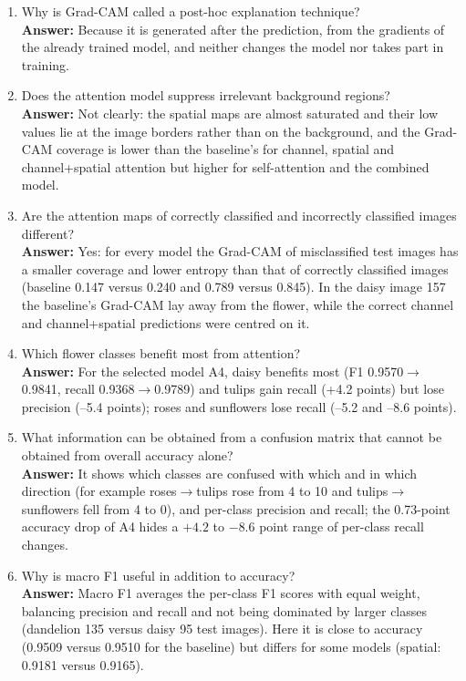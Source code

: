 \documentclass[10pt]{article}
\begin{document}
\begin{enumerate}
\item Why is Grad-CAM called a post-hoc explanation technique?\\
\textbf{Answer:} Because it is generated after the prediction, from the gradients of the already trained model, and neither changes the model nor takes part in training.

\item Does the attention model suppress irrelevant background regions?\\
\textbf{Answer:} Not clearly: the spatial maps are almost saturated and their low values lie at the image borders rather than on the background, and the Grad-CAM coverage is lower than the baseline's for channel, spatial and channel+spatial attention but higher for self-attention and the combined model.

\item Are the attention maps of correctly classified and incorrectly
classified images different?\\
\textbf{Answer:} Yes: for every model the Grad-CAM of misclassified test images has a smaller coverage and lower entropy than that of correctly classified images (baseline 0.147 versus 0.240 and 0.789 versus 0.845). In the daisy image 157 the baseline's Grad-CAM lay away from the flower, while the correct channel and channel+spatial predictions were centred on it.

\item Which flower classes benefit most from attention?\\
\textbf{Answer:} For the selected model A4, daisy benefits most (F1 0.9570$\rightarrow$0.9841, recall 0.9368$\rightarrow$0.9789) and tulips gain recall (+4.2 points) but lose precision (--5.4 points); roses and sunflowers lose recall (--5.2 and --8.6 points).

\item What information can be obtained from a confusion matrix that cannot
be obtained from overall accuracy alone?\\
\textbf{Answer:} It shows which classes are confused with which and in which direction (for example roses$\rightarrow$tulips rose from 4 to 10 and tulips$\rightarrow$sunflowers fell from 4 to 0), and per-class precision and recall; the 0.73-point accuracy drop of A4 hides a $+4.2$ to $-8.6$ point range of per-class recall changes.

\item Why is macro F1 useful in addition to accuracy?\\
\textbf{Answer:} Macro F1 averages the per-class F1 scores with equal weight, balancing precision and recall and not being dominated by larger classes (dandelion 135 versus daisy 95 test images). Here it is close to accuracy (0.9509 versus 0.9510 for the baseline) but differs for some models (spatial: 0.9181 versus 0.9165).


\end{enumerate}
\end{document}
